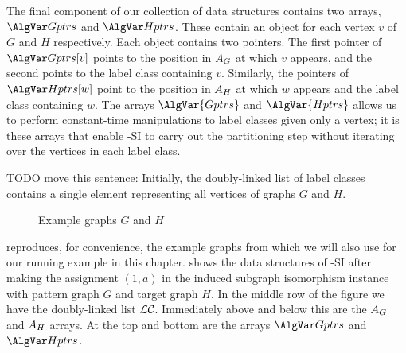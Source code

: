 The final component of our collection of data structures contains two arrays, $\Gptrs$
and $\Hptrs$.  These contain
an object for each vertex $v$ of $G$ and $H$ respectively.  Each object contains two pointers.
The first pointer of $\Gptrs[v]$ points to the position in $A_G$ at which $v$
appears, and the second points to the label class containing $v$.
Similarly, the pointers of $\Hptrs[w]$ point to the position in $A_H$ at which $w$
appears and the label class containing $w$.
The arrays $\AlgVar{Gptrs}$ and $\AlgVar{Hptrs}$ allows us to perform constant-time
manipulations to label classes given only a vertex; it is these arrays that enable
\McSplit-SI to carry out the partitioning step without iterating over the vertices in each label class.

TODO move this sentence:
Initially, the doubly-linked list of label classes contains a single element representing
all vertices of graphs $G$ and $H$.

\begin{figure}[h!]
    \centering
    \caption{Example graphs $G$ and $H$}
    \label{figure:example-g-and-h-redux}
\end{figure}

 reproduces, for convenience, the example
graphs from  which we will also use for our running example
in this chapter.
 shows the data structures of \McSplit-SI
after making the assignment $(1,a)$ in the induced subgraph isomorphism instance with pattern
graph $G$ and target graph $H$.  In the middle row of the figure we have the doubly-linked
list $\mathcal{LC}$.  Immediately above and below this are the $A_G$ and $A_H$ arrays.
At the top and bottom are the arrays $\Gptrs$ and $\Hptrs$.

